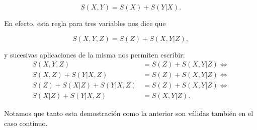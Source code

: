 \documentclass[11pt,a4paper]{article}
\begin{document}
\[
S(X,Y)=S(X) + S(Y|X).
\]

En efecto, esta regla para tres variables nos dice que

\[
S(X,Y,Z)=S(Z) + S(X,Y|Z),
\]

y sucesivas aplicaciones de la misma nos permiten escribir:
\begin{align*}
S(X,Y,Z)&=S(Z) + S(X,Y|Z) \iff\\
S(X, Z) + S(Y|X, Z) &= S(Z) + S(X,Y|Z) \iff\\
S(Z) + S(X|Z) + S(Y|X,Z)&=S(Z)+S(X,Y|Z)\iff\\
S(X|Z) + S(Y|X,Z)&=S(X,Y|Z).
\end{align*}

Notamos que tanto esta demostración como la anterior son válidas también en el caso continuo.
\end{document}
